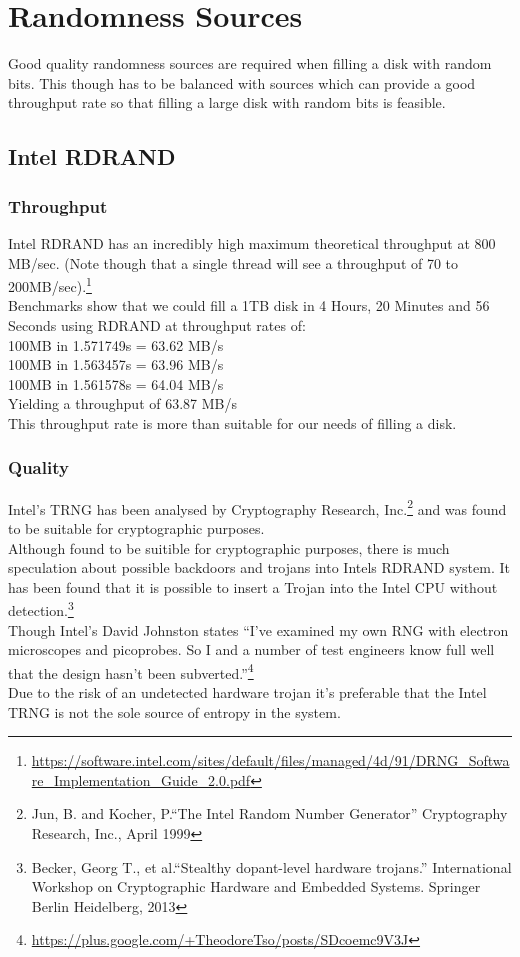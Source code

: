 \documentclass{paper}
\begin{document}
	
	\section{Randomness Sources}
		Good quality randomness sources are required when filling a disk with random bits. This though has to be balanced with sources which can provide a good throughput rate so that filling a large disk with random bits is feasible.\\ 
	
		\subsection{Intel RDRAND}
			\subsubsection{Throughput}
				Intel RDRAND has an incredibly high maximum theoretical throughput at 800 MB/sec. (Note though that a single thread will see a throughput of 70 to 200MB/sec).\footnote{\url{https://software.intel.com/sites/default/files/managed/4d/91/DRNG_Software_Implementation_Guide_2.0.pdf}} \\
				Benchmarks show that we could fill a 1TB disk in 4 Hours, 20 Minutes and 56 Seconds using RDRAND at throughput rates of:\\
				100MB in 1.571749s = 63.62 MB/s\\
				100MB in 1.563457s = 63.96 MB/s\\
				100MB in 1.561578s = 64.04 MB/s\\
				Yielding a  throughput of 63.87 MB/s\\
				This throughput rate is more than suitable for our needs of filling a disk.
			\subsubsection{Quality}
				Intel's TRNG has been analysed by Cryptography Research, Inc.\footnote{Jun, B. and Kocher, P.``The Intel Random Number Generator'' Cryptography Research, Inc., April 1999} and was found to be suitable for cryptographic purposes.\\
				Although found to be suitible for cryptographic purposes, there is much speculation about possible backdoors and trojans into Intels RDRAND system. It has been found that it is possible to insert a Trojan into the Intel CPU without detection.\footnote{Becker, Georg T., et al.``Stealthy dopant-level hardware trojans.'' International Workshop on Cryptographic Hardware and Embedded Systems. Springer Berlin Heidelberg, 2013}\\
				Though Intel's David Johnston states ``I’ve examined my own RNG with electron microscopes and picoprobes. So I and a number of test engineers know full well that the design hasn’t been subverted.''\footnote{\url{https://plus.google.com/+TheodoreTso/posts/SDcoemc9V3J}}\\
				Due to the risk of an undetected hardware trojan it's preferable that the Intel TRNG is not the sole source of entropy in the system.
				
\end{document}

